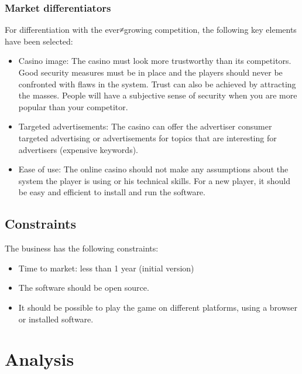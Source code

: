 \documentclass[a4paper,11pt]{report}
\begin{document}
\subsection{Market differentiators}
For differentiation with the ever≠growing competition, the following key elements have been selected:
\begin{itemize}
\item Casino image: The casino must look more trustworthy than its competitors. Good security measures must be in place and the players should never be confronted with flaws in the system. Trust can also be achieved by attracting the masses. People will have a subjective sense of security when you are more popular than your competitor.
\item Targeted advertisements: The casino can offer the advertiser consumer targeted advertising or advertisements for topics that are interesting for advertisers (expensive keywords).
\item Ease of use: The online casino should not make any assumptions about the system the player is using or his technical skills. For a new player, it should be easy and efficient to install and run the software.
\end{itemize}

\section{Constraints}
The business has the following constraints:
\begin{itemize}
\item Time to market: less than 1 year (initial version)
\item The software should be open source.
\item It should be possible to play the game on different platforms, using a browser or installed software.
\end{itemize}

\chapter{Analysis}
\end{document}
